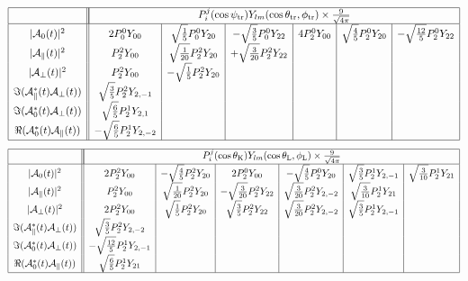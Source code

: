 \documentclass[a4paper,9pt,twoside]{article}
\def\thetatr{\theta_\mathrm{tr}}
\def\phitr{\phi_\mathrm{tr}}
\def\psitr{\psi_\mathrm{tr}}
\def\thetaK{\theta_\mathrm{K}}
\def\thetaL{\theta_\mathrm{L}}
\def\phiL{\phi_\mathrm{L}}
\begin{document}
\begin{equation}
\begin{array}{|c|| c | c | c | c | c | c |}
 \hline
&\multicolumn{6}{|c|}{ P_i^j(\cos\psitr)Y_{lm}(\cos\thetatr,\phitr) \times \frac{9}{\sqrt{4\pi}} } \\
 \hline
|{\cal A}_0(t)|^2                       &  2 P_0^0Y_{00}  & \sqrt{\frac{1}{5}} P_0^0 Y_{20} & -\sqrt{\frac{3}{5}} P_0^0 Y_{22}
                                        &  4 P_2^0Y_{00}  & \sqrt{\frac{4}{5}} P_2^0 Y_{20} & -\sqrt{\frac{12}{5}} P_2^0 Y_{22} \\
|{\cal A}_\parallel(t)|^2               &    P_2^2Y_{00} &  \sqrt{\frac{1}{20}} P_2^2 Y_{20} & +\sqrt{\frac{3}{20}} P_2^2Y_{22} & && \\
|{\cal A}_\perp(t)|^2                   &  P_2^2 Y_{00} & -\sqrt{\frac{1}{5}} P_2^2 Y_{20} &                                 &&& \\
\Im({\cal A}_\parallel^*(t){\cal A}_\perp(t)) &  \sqrt{\frac{3}{5}} P_2^2 Y_{2,-1} &&&&&\\
\Im({\cal A}_0^*(t){\cal A}_\perp(t))         &  \sqrt{\frac{6}{5}} P_2^1 Y_{2,1} &&&&&\\
\Re({\cal A}_0^*(t){\cal A}_\parallel(t))     & -\sqrt{\frac{6}{5}} P_2^1 Y_{2,-2} &&&&&\\
 \hline
\end{array}
\end{equation}
\begin{equation}
\begin{array}{|c|| c | c | c | c | c | c |}
 \hline
&\multicolumn{6}{|c|}{ P_i^j(\cos\thetaK)Y_{lm}(\cos\thetaL,\phiL) \times \frac{9}{\sqrt{4\pi}} } \\
 \hline
|{\cal A}_0(t)|^2                       & 2P_2^2Y_{00} & -\sqrt{\frac{4}{5}}P_2^2Y_{20} & 2P_2^0Y_{00} & -\sqrt{\frac{4}{5}} P_2^0Y_{20} & \sqrt{\frac{3}{5}} P_2^1 Y_{2,-1}& \sqrt{\frac{3}{10}}P_2^1Y_{21} \\
|{\cal A}_\parallel(t)|^2               & P_2^2Y_{00} &\sqrt{\frac{1}{20}} P_2^2Y_{20} &-\sqrt{\frac{3}{20}}P_2^2Y_{22} & \sqrt{\frac{3}{20}}P_2^2Y_{2,-2} & \sqrt{\frac{3}{10}} P_2^1Y_{21}& \\
|{\cal A}_\perp(t)|^2                   & 2P_2^2Y_{00} & \sqrt{\frac{1}{5}} P_2^2Y_{20} &\sqrt{\frac{3}{5}}P_2^2Y_{22} & \sqrt{\frac{3}{20}}P_2^2Y_{2,-2} &\sqrt{\frac{3}{5}}P_2^1Y_{2,-1}& \\
\Im({\cal A}_\parallel^*(t){\cal A}_\perp(t)) & \sqrt{\frac{3}{5}}P_2^2Y_{2,-2}&&&&&\\
\Im({\cal A}_0^*(t){\cal A}_\perp(t))         & -\sqrt{\frac{12}{5}}P_2^1Y_{2,-1}&&&&&\\
\Re({\cal A}_0^*(t){\cal A}_\parallel(t))     & \sqrt{\frac{6}{5}}P_2^1Y_{21}&&&&&\\
 \hline
\end{array}
\end{equation}
\end{document}
